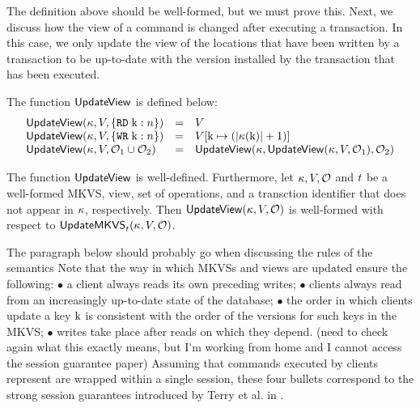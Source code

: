 \ac{The definition above should be well-formed, but we must prove this.}
Next, we discuss how the view of a command is changed after executing 
a transaction. In this case, we only update the view of the locations that 
have been written by a transaction to be up-to-date with the version 
installed by the transaction that has been executed. 

\begin{definition}
The function $\mathsf{UpdateView}$ is defined below: 
\[
\begin{array}{lll}
\mathsf{UpdateView}(\kappa, V, \{{{\tt RD}}\;\mathrm{k}: n\}) &=& V\\
\mathsf{UpdateView}(\kappa, V, \{{{\tt WR}}\;\mathrm{k}: n \}) &=& V[ \mathrm{k} \mapsto ( \lvert \kappa(\mathrm{k}) \rvert + 1)]\\
\mathsf{UpdateView}(\kappa, V, \mathcal{O}_1 \cup \mathcal{O}_2) &=& \mathsf{UpdateView}(\kappa, \mathsf{UpdateView}(\kappa, V, \mathcal{O}_1), \mathcal{O}_2)
\end{array}
\]
\end{definition}

\begin{lemma}
The function $\mathsf{UpdateView}$ is well-defined. Furthermore, let $\kappa, V, \mathcal{O}$ and $t$ 
be a well-formed MKVS, view, set of operations, and a transction identifier that does not appear 
in $\kappa$, respectively. Then $\mathsf{UpdateView}(\kappa, V, \mathcal{O})$ is well-formed with respect 
to $\mathsf{UpdateMKVS}_{t}(\kappa, V, \mathcal{O})$.
\end{lemma}

\ac{The paragraph below should probably go when discussing the rules of the semantics}
Note that the way in which MKVSs and views are updated ensure the following: 
$\bullet$ a client always reads its own preceding writes; 
$\bullet$ clients always read from an increasingly up-to-date state of the database; 
$\bullet$ the order in which clients update a key $\mathrm{k}$ is consistent with the 
order of the versions for such keys in the MKVS; 
$\bullet$ writes take place after reads on which they depend. 
\ac{(need to check again what this exactly means, but I'm working from home and I cannot access the 
session guarantee paper)}
Assuming that commands executed by clients represent are wrapped within a single session,
these four bullets correspond to the strong session guarantees introduced by Terry et al. 
in \cite{sessionguarantees}. 




